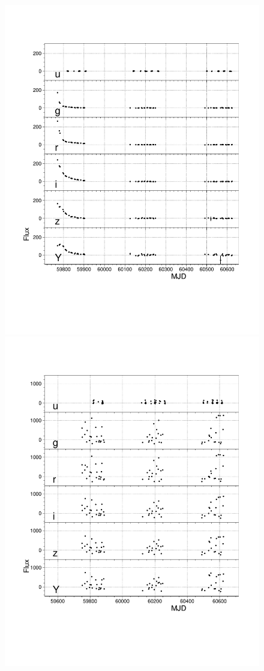 \documentclass[\docopts]{\docclass}
\begin{document}
\begin{figure}[htbp!]
\begin{center}
\includegraphics[scale=0.4,trim = 15mm 45mm 10mm 20mm, clip]{figures/lcplot_model01b.pdf}
\includegraphics[scale=0.4,trim = 15mm 45mm 10mm 20mm, clip]{figures/lcplot_model80.pdf}

\end{center}
\end{figure}
\end{document}
